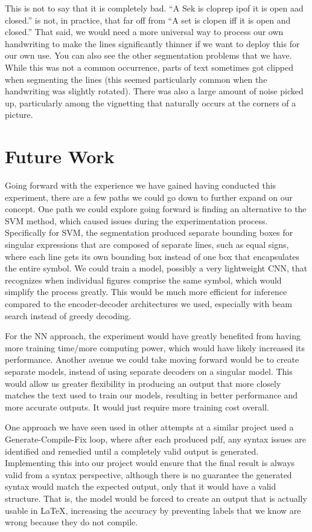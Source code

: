 \documentclass[11pt]{article}
\begin{document}
This is not to say that it is completely bad. ``A Sek is cloprep ipof it is open aad closed.'' is not, in practice, that far off from ``A set is clopen iff it is open and closed.'' That said, we would need a more universal way to process our own handwriting to make the lines significantly thinner if we want to deploy this for our own use. You can also see the other segmentation problems that we have. While this was not a common occurrence, parts of text sometimes got clipped when segmenting the lines (this seemed particularly common when the handwriting was slightly rotated). There was also a large amount of noise picked up, particularly among the vignetting that naturally occurs at the corners of a picture.

\section{Future Work}

Going forward with the experience we have gained having conducted this experiment, there are a few paths we could go down to further expand on our concept. One path we could explore going forward is finding an alternative to the SVM method, which caused issues during the experimentation process. Specifically for SVM, the segmentation produced separate bounding boxes for singular expressions that are composed of separate lines, such as equal signs, where each line gets its own bounding box instead of one box that encapsulates the entire symbol. We could train a model, possibly a very lightweight CNN, that recognizes when individual figures comprise the same symbol, which would simplify the process greatly. This would be much more efficient for inference compared to the encoder-decoder architectures we used, especially with beam search instead of greedy decoding.

For the NN approach, the experiment would have greatly benefited from having more training time/more computing power, which would have likely increased its performance. Another avenue we could take moving forward would be to create separate models, instead of using separate decoders on a singular model. This would allow us greater flexibility in producing an output that more closely matches the text used to train our models, resulting in better performance and more accurate outputs. It would just require more training cost overall.

One approach we have seen used in other attempts at a similar project used a Generate-Compile-Fix loop, where after each produced pdf, any syntax issues are identified and remedied until a completely valid output is generated. Implementing this into our project would ensure that the final result is always valid from a syntax perspective, although there is no guarantee the generated syntax would match the expected output, only that it would have a valid structure. That is, the model would be forced to create an output that is actually usable in LaTeX, increasing the accuracy by preventing labels that we know are wrong because they do not compile.
\end{document}
